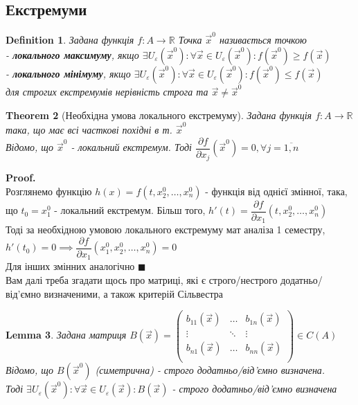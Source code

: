 \documentclass[a4paper, 14pt]{extarticle}
\def\bigline{\vspace{5mm}\\}
\theoremstyle{theoremdd}
\newtheorem{theorem}{Theorem}[subsection]
\theoremstyle{theoremdd}
\newtheorem{definition}[theorem]{Definition}
\theoremstyle{theoremdd}
\theoremstyle{theoremdd}
\theoremstyle{theoremdd}
\theoremstyle{theoremdd}
\theoremstyle{theoremdd}
\newtheorem{lemma}[theorem]{Lemma}
\theoremstyle{theoremdd}
\newenvironment{pf}{\vspace*{-3mm} \textbf{Proof. \\}}{$\blacksquare$}
\def\departial#1#2{\dfrac{\partial {#1}}{\partial {#2}}}
\begin{document}
\subsection{Екстремуми}
\begin{definition}
Задана функція $f:A\to \mathbb{R}$
Точка $\vec{x}^0$ називається точкою\\
- \textbf{локального максимуму}, якщо $\exists U_{\varepsilon}(\vec{x}^0): \forall \vec{x} \in U_{\varepsilon}(\vec{x}^0): f(\vec{x}^0) \geq f(\vec{x})$\\
- \textbf{локального мінімуму}, якщо $\exists U_{\varepsilon}(\vec{x}^0): \forall \vec{x} \in U_{\varepsilon}(\vec{x}^0): f(\vec{x}^0) \leq f(\vec{x})$\\
для строгих екстремумів нерівність строга та $\vec{x} \neq \vec{x}^0$
\end{definition}

\begin{theorem}[Необхідна умова локального екстремуму]
Задана функція $f: A \to \mathbb{R}$ така, що має всі часткові похідні в т. $\vec{x}^0$\\
Відомо, що $\vec{x}^0$ - локальний екстремум. Тоді $\departial{f}{x_j}(\vec{x}^0) = 0, \forall j=\overline{1,n}$
\end{theorem}

\begin{pf}
Розглянемо функцію $h(x) = f(t,x_2^0,\dots,x_n^0)$ - функція від однієї змінної, така, що $t_0 = x_1^0$ - локальний екстремум. Більш того, $h'(t) = \departial{f}{x_1}(t,x_2^0,\dots,x_n^0)$\\
Тоді за необхідною умовою локального екстремуму мат аналіза 1 семестру, $h'(t_0) = 0 \implies \departial{f}{x_1}(x_1^0,x_2^0,\dots,x_n^0) = 0$\\
Для інших змінних аналогічно
\end{pf}
\bigline
Вам далі треба згадати щось про матриці, які є строго/нестрого додатньо/від'ємно визначеними, а також критерій Сільвестра

\begin{lemma}
Задана матриця $B(\vec{x}) = \begin{pmatrix}
b_{11}(\vec{x}) & \dots & b_{1n}(\vec{x}) \\
\vdots & \ddots & \vdots \\
b_{n1}(\vec{x}) & \dots & b_{nn}(\vec{x}) \\
\end{pmatrix} \in C(A)$\\
Відомо, що $B(\vec{x}^0)$ (симетрична) - строго додатньо/від'ємно визначена. \\ Тоді $\exists U_{\varepsilon}(\vec{x}^0): \forall \vec{x} \in U_{\varepsilon}(\vec{x}): B(\vec{x})$ - строго додатньо/від'ємно визначена
\end{lemma}
\end{document}
